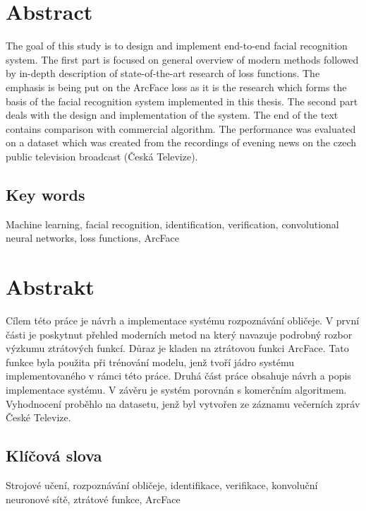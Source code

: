 \section*{Abstract}
The goal of this study is to design and implement end-to-end facial recognition system.
The first part is focused on general overview of modern methods followed by in-depth description of
state-of-the-art research of loss functions.
The emphasis is being put on the ArcFace loss as it is the research which forms the basis of the facial recognition
system implemented in this thesis.
The second part deals with the design and implementation of the system.
The end of the text contains comparison with commercial algorithm.
The performance was evaluated on a dataset which was created from the recordings of evening news on the czech public
television broadcast (Česká Televize).

\vspace{1cm}

\subsection*{Key words}
Machine learning, facial recognition, identification, verification, convolutional neural networks, loss functions,
ArcFace

\vfill

\section*{Abstrakt}
Cílem této práce je návrh a implementace systému rozpoznávání obličeje.
V první části je poskytnut přehled moderních metod na který navazuje podrobný rozbor výzkumu ztrátových funkcí.
Důraz je kladen na ztrátovou funkci ArcFace.
Tato funkce byla použita při trénování modelu, jenž tvoří jádro systému implementovaného v rámci této práce.
Druhá část práce obsahuje návrh a popis implementace systému.
V závěru je systém porovnán s komerčním algoritmem.
Vyhodnocení proběhlo na datasetu, jenž byl vytvořen ze záznamu večerních zpráv České Televize.

\vspace{1cm}

\subsection*{Klíčová slova}
Strojové učení, rozpoznávání obličeje, identifikace, verifikace, konvoluční neuronové sítě, ztrátové funkce, ArcFace